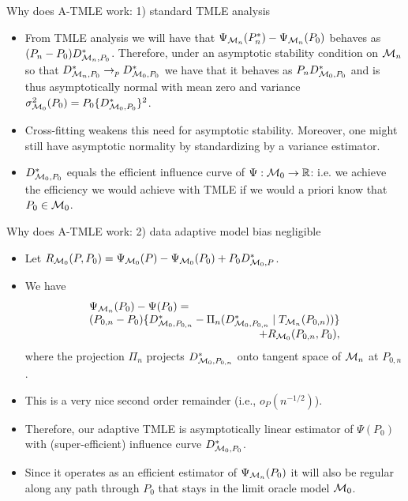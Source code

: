 \documentclass[t]{beamer}
\begin{document}
\begin{frame}{Why does A-TMLE work: 1) standard TMLE analysis}
\begin{itemize}
\item From TMLE analysis we will have that $\Psi_{{\cal M}_n}(P_n^*)-\Psi_{{\cal M}_n}(P_0)$ behaves as $(P_n-P_0)D^*_{{\cal M}_n,P_0}$. Therefore, under an asymptotic stability condition on ${\cal M}_n$ so that $D^*_{{\cal M}_n,P_0}\rightarrow_p D^*_{{\cal M}_0,P_0}$ we have that it behaves as $P_n D^*_{{\cal M}_0,P_0}$ and is thus asymptotically normal with mean zero and variance $\sigma^2_{{\cal M}_0}(P_0)=P_0\{D^*_{{\cal M}_0,P_0}\}^2$.
\item Cross-fitting weakens this need for asymptotic stability. Moreover, one might still have asymptotic normality by standardizing by a variance estimator.
\item $D^*_{{\cal M}_0,P_0}$ equals the efficient influence curve of $\Psi:{\cal
M}_0\rightarrow \mathbb{R}$: i.e. we achieve the efficiency we would achieve with TMLE if we would  a priori know that $P_0\in {\cal M}_0$.
\end{itemize}
\end{frame}

\begin{frame}{Why does A-TMLE work: 2) data adaptive model bias negligible}
\begin{itemize}
\item Let $R_{{\cal M}_0}(P,P_0)=\Psi_{{\cal M}_0}(P)-\Psi_{{\cal M}_0}(P_0)+P_0 D^*_{{\cal M}_0,P}$.
\item We have
\[
\begin{array}{l}
\Psi_{{\cal M}_n}(P_0)-\Psi(P_0)=\\
(P_{0,n}-P_0)\{D^*_{{\cal M}_0,P_{0,n}}-\Pi_n(D^*_{{\cal M}_0,P_{0,n}}\mid T_{{\cal  M}_n}(P_{0,n}))\}\\
\hfill +R_{{\cal M}_0}(P_{0,n},P_0),
\end{array}
\]
where the projection $\Pi_n$ projects $D^*_{{\cal M}_0,P_{0,n}}$ onto tangent space of ${\cal M}_n$ at $P_{0,n}$.
\end{itemize}
\end{frame}

\begin{frame}
\begin{itemize}
\item This is a very nice second order remainder (i.e., $o_P(n^{-1/2})$).
\item Therefore, our adaptive TMLE is asymptotically linear estimator of $\Psi(P_0)$ with (super-efficient) influence curve $D^*_{{\cal M}_0,P_0}$.
\item Since it operates as an efficient estimator of $\Psi_{{\cal M}_n}(P_0)$ it will also be regular along any path through $P_0$ that stays in the limit oracle model ${\cal M}_0$.
\end{itemize}
\end{frame}
\end{document}
